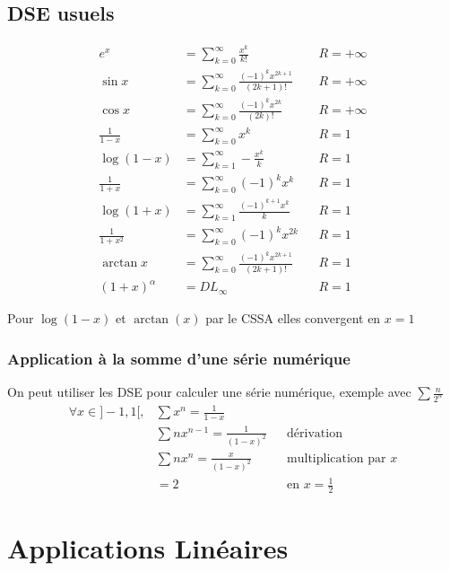 \documentclass[11pt,colorlinks]{book}
\theoremstyle{mytheoremstyle}
\theoremstyle{mytheoremstyle}
\theoremstyle{mytheoremstyle}
\theoremstyle{mytheoremstyle}
\theoremstyle{mytheoremstyle}
\theoremstyle{mytheoremstyle}
\theoremstyle{mytheoremstyle}
\theoremstyle{mytheoremstyle}
\theoremstyle{myproblemstyle}
\begin{document}
\section{DSE usuels}
\begin{prop}
  \begin{align*}
    e^{x} &= \sum_{k=0}^{\infty} \frac{x^k}{k!} && R=+\infty \\
    \sin x &= \sum_{k=0}^{\infty} \frac{(-1)^k x^{2k+1}}{(2k+1)!} && R=+\infty \\
    \cos x &= \sum_{k=0}^{\infty} \frac{(-1)^{k} x^{2k}}{(2k)!} && R=+\infty \\
    \frac{1}{1-x} &= \sum_{k=0}^{\infty} x^k && R=1 \\
    \log (1-x) &= \sum_{k=1}^{\infty} - \frac{x^k}{k} && R=1 \\
    \frac{1}{1+x} &= \sum_{k=0}^{\infty} (-1)^k x^k && R=1 \\ 
    \log (1+x) &= \sum_{k=1}^{\infty} \frac{(-1)^{k+1} x^k}{k} && R=1 \\ 
    \frac{1}{1+x^2} &= \sum_{k=0}^{\infty} (-1)^k x^{2k} && R=1 \\
    \arctan x &= \sum_{k=0}^{\infty} \frac{(-1)^k x^{2k+1}}{(2k+1)!} && R=1 \\ 
    (1+x)^{\alpha} &= DL_{\infty} && R=1
  \end{align*}
\end{prop}
\begin{rmq}
  Pour $\log (1-x)$ et $\arctan(x)$ par le CSSA elles convergent en $x=1$
\end{rmq}
\subsection{Application à la somme d'une série numérique}
\begin{rmq}
  On peut utiliser les DSE pour calculer une série numérique, exemple avec $\sum \frac{n}{2^n}$
  \begin{align*}
    \forall x \in ]-1,1[, &\sum x^n = \frac{1}{1-x} \\ 
    &\sum nx^{n-1} = \frac{1}{(1-x)^2} && \text{dérivation} \\ 
    &\sum nx^{n} = \frac{x}{(1-x)^2} && \text{multiplication par }x \\ 
    &=2 && \text{en } x=\frac{1}{2}
  \end{align*}
\end{rmq}


\chapter{Applications Linéaires}
\end{document}
